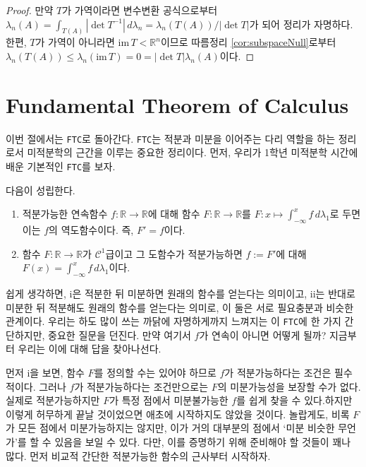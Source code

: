 \begin{proof}
    만약 $T$가 가역이라면 변수변환 공식으로부터 $\lambda_n(A)=\int_{T(A)}|\det T^{-1}|\,d\lambda_n=\lambda_n(T(A))/|\det T|$가 되어 정리가 자명하다. 한편, $T$가 가역이 아니라면 $\mathrm{im}\,T<\mathbb{R}^n$이므로 따름정리 \ref{cor:subspaceNull}로부터 $\lambda_n(T(A))\leq\lambda_n(\mathrm{im}\,T)=0=|\det T|\lambda_n(A)$이다.
\end{proof}

\section{Fundamental Theorem of Calculus}

이번 절에서는 \texttt{FTC}로 돌아간다. \texttt{FTC}는 적분과 미분을 이어주는 다리 역할을 하는 정리로서 미적분학의 근간을 이루는 중요한 정리이다. 먼저, 우리가 1학년 미적분학 시간에 배운 기본적인 \texttt{FTC}를 보자.

\vspace{6pt}
 다음이 성립한다.
\begin{enumerate}
    \item 적분가능한 연속함수 $f:\mathbb{R}\to\mathbb{R}$에 대해 함수 $F:\mathbb{R}\to\mathbb{R}$를 $F:x\mapsto\int_{-\infty}^xf\,d\lambda_1$로 두면 이는 $f$의 역도함수이다. 즉, $F'=f$이다.
    \item 함수 $F:\mathbb{R}\to\mathbb{R}$가 $\mathcal{C}^1$급이고 그 도함수가 적분가능하면 $f:=F'$에 대해 $F(x)=\int_{-\infty}^xf\,d\lambda_1$이다.
\end{enumerate}

쉽게 생각하면, i은 적분한 뒤 미분하면 원래의 함수를 얻는다는 의미이고, ii는 반대로 미분한 뒤 적분해도 원래의 함수를 얻는다는 의미로, 이 둘은 서로 필요충분과 비슷한 관계이다. 우리는 하도 많이 쓰는 까닭에 자명하게까지 느껴지는 이 \texttt{FTC}에 한 가지 간단하지만, 중요한 질문을 던진다. 만약 여기서 $f$가 연속이 아니면 어떻게 될까? 지금부터 우리는 이에 대해 답을 찾아나선다.

먼저 i을 보면, 함수 $F$를 정의할 수는 있어야 하므로 $f$가 적분가능하다는 조건은 필수적이다. 그러나 $f$가 적분가능하다는 조건만으로는 $F$의 미분가능성을 보장할 수가 없다. 실제로 적분가능하지만 $F$가 특정 점에서 미분불가능한 $f$를 쉽게 찾을 수 있다.\footnotemark 하지만 이렇게 허무하게 끝날 것이었으면 애초에 시작하지도 않았을 것이다. 놀랍게도, 비록 $F$가 모든 점에서 미분가능하지는 않지만, 이가 거의 대부분의 점에서 `미분 비슷한 무언가'를 할 수 있음을 보일 수 있다. 다만, 이를 증명하기 위해 준비해야 할 것들이 꽤나 많다. 먼저 비교적 간단한 적분가능한 함수의 근사부터 시작하자.

